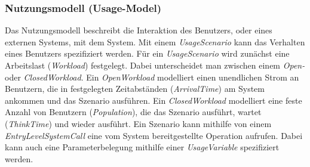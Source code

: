 \subsubsection{Nutzungsmodell (Usage-Model)}
Das Nutzungsmodell beschreibt die Interaktion des Benutzers, oder eines externen Systems, mit dem System. Mit einem \emph{UsageScenario} kann das Verhalten eines Benutzers spezifiziert werden. Für ein \emph{UsageScenario} wird zunächst eine Arbeitslast (\emph{Workload}) festgelegt. Dabei unterscheidet man zwischen einem \emph{Open-} oder \emph{ClosedWorkload}. Ein \emph{OpenWorkload} modelliert einen unendlichen Strom an Benutzern, die in festgelegten Zeitabständen (\emph{ArrivalTime}) am System ankommen und das Szenario ausführen. Ein \emph{ClosedWorkload} modelliert eine feste Anzahl von Benutzern (\emph{Population}), die das Szenario ausführt, wartet (\emph{ThinkTime}) und wieder ausführt. Ein Szenario kann mithilfe von einem \emph{EntryLevelSystemCall} eine vom System bereitgestellte Operation aufrufen. Dabei kann auch eine Parameterbelegung mithilfe einer \emph{UsageVariable} spezifiziert werden. 

